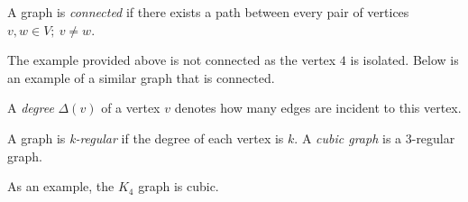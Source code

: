 \begin{definition}
    A graph is \textit{connected} if there exists a path between every pair of vertices $v,w \in V; ~ v \neq w$.
\end{definition}

The example provided above is not connected as the vertex $4$ is isolated. Below is an example of a similar graph that is connected.

\begin{figure}[h]
    \centering
\end{figure}

\begin{definition}
    A \textit{degree} $\Delta (v)$ of a vertex $v$ denotes how many edges are incident to this vertex.
\end{definition}

\begin{definition}
    A graph is \textit{k-regular} if the degree of each vertex is $k$. A \textit{cubic graph} is a 3-regular graph.
\end{definition}

As an example, the $K_4$ graph is cubic.

\begin{figure}[h]
    \centering
\end{figure}

